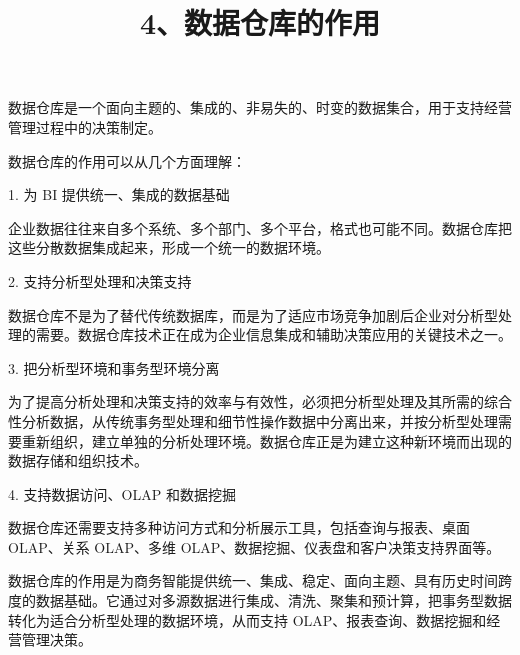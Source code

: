 \documentclass[UTF8,zihao=-4]{ctexart}
\begin{document}
\title{4、数据仓库的作用}
\author{}
\date{}
\maketitle

数据仓库是一个面向主题的、集成的、非易失的、时变的数据集合，用于支持经营管理过程中的决策制定。\par

数据仓库的作用可以从几个方面理解：\par

1. 为 BI 提供统一、集成的数据基础\par

企业数据往往来自多个系统、多个部门、多个平台，格式也可能不同。数据仓库把这些分散数据集成起来，形成一个统一的数据环境。\par

2. 支持分析型处理和决策支持\par

数据仓库不是为了替代传统数据库，而是为了适应市场竞争加剧后企业对分析型处理的需要。数据仓库技术正在成为企业信息集成和辅助决策应用的关键技术之一。\par

3. 把分析型环境和事务型环境分离\par

为了提高分析处理和决策支持的效率与有效性，必须把分析型处理及其所需的综合性分析数据，从传统事务型处理和细节性操作数据中分离出来，并按分析型处理需要重新组织，建立单独的分析处理环境。数据仓库正是为建立这种新环境而出现的数据存储和组织技术。\par

4. 支持数据访问、OLAP 和数据挖掘\par

数据仓库还需要支持多种访问方式和分析展示工具，包括查询与报表、桌面 OLAP、关系 OLAP、多维 OLAP、数据挖掘、仪表盘和客户决策支持界面等。\par

数据仓库的作用是为商务智能提供统一、集成、稳定、面向主题、具有历史时间跨度的数据基础。它通过对多源数据进行集成、清洗、聚集和预计算，把事务型数据转化为适合分析型处理的数据环境，从而支持 OLAP、报表查询、数据挖掘和经营管理决策。\par
\end{document}
